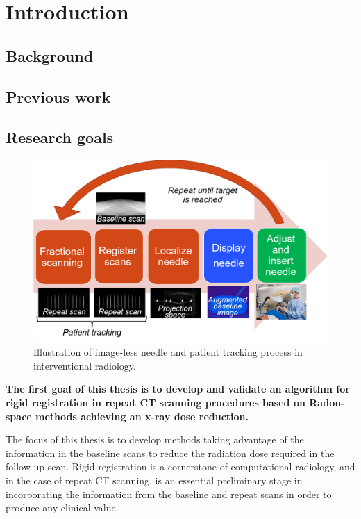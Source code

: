 \chapter{Introduction}

\section{Background}

\section{Previous work}

\section{Research goals}

\begin{figure}
    \centering
    \includegraphics[width=\textwidth]{figures/needle+patient_tracking.png}
    \caption{Illustration of image-less needle and patient tracking process in interventional radiology.
}
    \label{fig:figures/needle+patient_tracking.png}
\end{figure}

\textbf{The first goal of this thesis is to develop and validate an algorithm for rigid registration in repeat CT scanning procedures based on Radon-space methods achieving an x-ray dose reduction.}

The focus of this thesis is to develop methods taking advantage of the information in the baseline scans to reduce the radiation dose required in the follow-up scan. Rigid registration is a cornerstone of computational radiology, and in the case of repeat CT scanning, is an essential preliminary stage in incorporating the information from the baseline and repeat scans in order to produce any clinical value.

